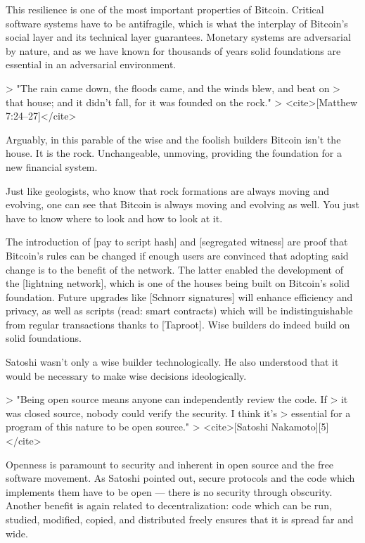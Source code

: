 This resilience is one of the most important properties of Bitcoin.
Critical software systems have to be antifragile, which is what the
interplay of Bitcoin's social layer and its technical layer guarantees.
Monetary systems are adversarial by nature, and as we have known for
thousands of years solid foundations are essential in an adversarial
environment.

> "The rain came down, the floods came, and the winds blew, and beat on
> that house; and it didn't fall, for it was founded on the rock."
> <cite>[Matthew 7:24--27]</cite>

Arguably, in this parable of the wise and the foolish builders Bitcoin
isn't the house. It is the rock. Unchangeable, unmoving, providing the
foundation for a new financial system.

Just like geologists, who know that rock formations are always moving
and evolving, one can see that Bitcoin is always moving and evolving as
well. You just have to know where to look and how to look at it.

The introduction of [pay to script hash] and [segregated witness] are
proof that Bitcoin's rules can be changed if enough users are convinced
that adopting said change is to the benefit of the network. The latter
enabled the development of the [lightning network], which is one of the
houses being built on Bitcoin's solid foundation. Future upgrades like
[Schnorr signatures] will enhance efficiency and privacy, as well as
scripts (read: smart contracts) which will be indistinguishable from
regular transactions thanks to [Taproot]. Wise builders do indeed build
on solid foundations.

Satoshi wasn't only a wise builder technologically. He also understood
that it would be necessary to make wise decisions ideologically.

> "Being open source means anyone can independently review the code. If
> it was closed source, nobody could verify the security. I think it's
> essential for a program of this nature to be open source."
> <cite>[Satoshi Nakamoto][5]</cite>

Openness is paramount to security and inherent in open source and the
free software movement. As Satoshi pointed out, secure protocols and the
code which implements them have to be open --- there is no security
through obscurity. Another benefit is again related to decentralization:
code which can be run, studied, modified, copied, and distributed freely
ensures that it is spread far and wide.

